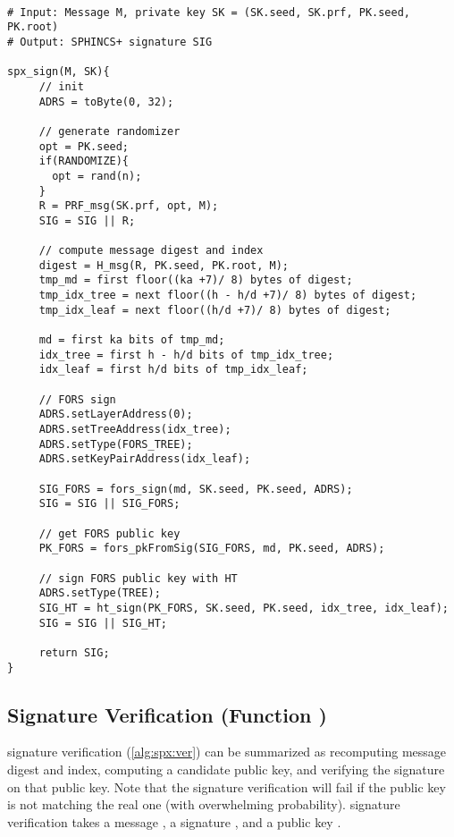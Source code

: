 \begin{lstlisting}[label=alg:spx:sign, mathescape, language=pseudoc,
                   caption=\spxsign\ -- Generating a \spx signature]
   
# Input: Message M, private key SK = (SK.seed, SK.prf, PK.seed, PK.root)
# Output: SPHINCS+ signature SIG

spx_sign(M, SK){
     // init
     ADRS = toByte(0, 32);
     
     // generate randomizer
     opt = PK.seed;
     if(RANDOMIZE){
       opt = rand(n);
     }
     R = PRF_msg(SK.prf, opt, M);
     SIG = SIG || R;
     
     // compute message digest and index
     digest = H_msg(R, PK.seed, PK.root, M);
     tmp_md = first floor((ka +7)/ 8) bytes of digest;
     tmp_idx_tree = next floor((h - h/d +7)/ 8) bytes of digest;
     tmp_idx_leaf = next floor((h/d +7)/ 8) bytes of digest;
     
     md = first ka bits of tmp_md;
     idx_tree = first h - h/d bits of tmp_idx_tree;
     idx_leaf = first h/d bits of tmp_idx_leaf;

     // FORS sign
     ADRS.setLayerAddress(0);
     ADRS.setTreeAddress(idx_tree);
     ADRS.setType(FORS_TREE);
     ADRS.setKeyPairAddress(idx_leaf);

     SIG_FORS = fors_sign(md, SK.seed, PK.seed, ADRS);
     SIG = SIG || SIG_FORS;
     
     // get FORS public key
     PK_FORS = fors_pkFromSig(SIG_FORS, md, PK.seed, ADRS);
     
     // sign FORS public key with HT
     ADRS.setType(TREE);
     SIG_HT = ht_sign(PK_FORS, SK.seed, PK.seed, idx_tree, idx_leaf);
     SIG = SIG || SIG_HT;
     
     return SIG;
}
\end{lstlisting}

\subsection{\spx Signature Verification (Function \spxverify)}

   \spx signature verification (\autoref{alg:spx:ver}) can be summarized as 
   recomputing message digest and index, computing a candidate \fors public key,
   and verifying the \hyper signature on that public key. Note that the \hyper
   signature verification will fail if the \fors public key is not matching the
   real one (with overwhelming probability). \spx signature verification takes 
   a message \msg, a signature \spxsig, and a \spx public key \PK.

